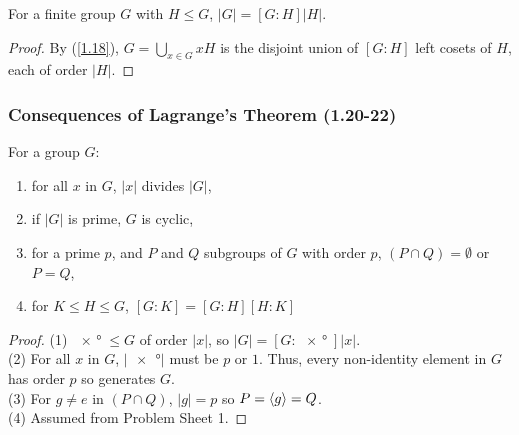 For a finite group $G$ with $H \leq G$, $|G| = [G : H]|H|$.

\begin{proof}
    By (\ref{1.18}), $G = \bigcup_{x \in G} xH$ is the disjoint union of
    $[G : H]$ left cosets of $H$, each of order $|H|$.
\end{proof}

\newpage

\subsubsection{Consequences of Lagrange's Theorem (1.20-22)}
\label{1.20} \label{1.21} \label{1.22}

For a group $G$: \begin{enumerate}
    \item for all $x$ in $G$, $|x|$ divides $|G|$,
    \item if $|G|$ is prime, $G$ is cyclic,
    \item for a prime $p$, and $P$ and $Q$ subgroups of $G$ with order $p$,
        $(P \cap Q) = \emptyset$ or $P = Q$,
    \item for $K \leq H \leq G$, $[G : K] = [G : H][H : K]$
\end{enumerate}

\begin{proof}
    (1) $\ang{x} \leq G$ of order $|x|$, so $|G| = [G : \ang{x}]|x|$. \\[\baselineskip]
    (2) For all $x$ in $G$, $|\ang{x}|$ must be $p$ or $1$. Thus, every non-identity
    element in $G$ has order $p$ so generates $G$. \\[\baselineskip]
    (3) For $g \neq e$ in $(P \cap Q)$, $|g| = p$ so $P = {\langle g \rangle} = Q$. \\[\baselineskip]
    (4) Assumed from Problem Sheet 1.
\end{proof}
